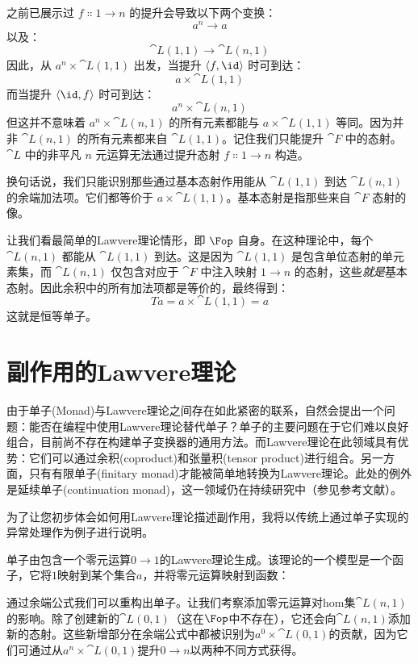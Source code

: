 \noindent
之前已展示过 $f \Colon 1 \to n$ 的提升会导致以下两个变换：
$$a^n \to a$$
以及：
$$\cat{L}(1, 1) \to \cat{L}(n, 1)$$
因此，从 $a^n \times \cat{L}(1, 1)$ 出发，当提升 $\langle f, \id \rangle$ 时可到达：
$$a \times \cat{L}(1, 1)$$
而当提升 $\langle \id, f \rangle$ 时可到达：
$$a^n \times \cat{L}(n, 1)$$
但这并不意味着 $a^n \times \cat{L}(n, 1)$ 的所有元素都能与 $a \times \cat{L}(1, 1)$ 等同。因为并非 $\cat{L}(n, 1)$ 的所有元素都来自 $\cat{L}(1, 1)$。记住我们只能提升 $\cat{F}$ 中的态射。$\cat{L}$ 中的非平凡 $n$ 元运算无法通过提升态射 $f \Colon 1 \to n$ 构造。

换句话说，我们只能识别那些通过基本态射作用能从 $\cat{L}(1, 1)$ 到达 $\cat{L}(n, 1)$ 的余端加法项。它们都等价于 $a \times \cat{L}(1, 1)$。基本态射是指那些来自 $\cat{F}$ 态射的像。

让我们看最简单的Lawvere理论情形，即 $\Fop$ 自身。在这种理论中，每个 $\cat{L}(n, 1)$ 都能从 $\cat{L}(1, 1)$ 到达。这是因为 $\cat{L}(1, 1)$ 是包含单位态射的单元素集，而 $\cat{L}(n, 1)$ 仅包含对应于 $\cat{F}$ 中注入映射 $1 \to n$ 的态射，这些\emph{就是}基本态射。因此余积中的所有加法项都是等价的，最终得到：
$$T a = a \times \cat{L}(1, 1) = a$$
这就是恒等单子。

\section{副作用的Lawvere理论}

由于单子(Monad)与Lawvere理论之间存在如此紧密的联系，自然会提出一个问题：能否在编程中使用Lawvere理论替代单子？单子的主要问题在于它们难以良好组合，目前尚不存在构建单子变换器的通用方法。而Lawvere理论在此领域具有优势：它们可以通过余积(coproduct)和张量积(tensor product)进行组合。另一方面，只有有限单子(finitary monad)才能被简单地转换为Lawvere理论。此处的例外是延续单子(continuation monad)，这一领域仍在持续研究中（参见参考文献）。

为了让您初步体会如何用Lawvere理论描述副作用，我将以传统上通过单子实现的异常处理作为例子进行说明。

单子由包含一个零元运算$0 \to 1$的Lawvere理论生成。该理论的一个模型是一个函子，它将$1$映射到某个集合$a$，并将零元运算映射到函数：

通过余端公式我们可以重构出单子。让我们考察添加零元运算对hom集$\cat{L}(n, 1)$的影响。除了创建新的$\cat{L}(0, 1)$（这在$\Fop$中不存在），它还会向$\cat{L}(n, 1)$添加新的态射。这些新增部分在余端公式中都被识别为$a^0 \times \cat{L}(0, 1)$的贡献，因为它们可通过从$a^n \times \cat{L}(0, 1)$提升$0 \to n$以两种不同方式获得。

